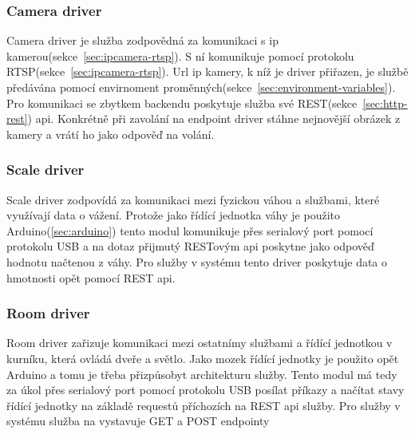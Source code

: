 \subsubsection{Camera driver}
Camera driver je služba zodpovědná za komunikaci s ip kamerou(sekce~\ref{sec:ipcamera-rtsp}).\newline
S ní komunikuje pomocí protokolu RTSP(sekce~\ref{sec:ipcamera-rtsp}).
Url ip kamery, k níž je driver přiřazen, je službě předávána pomocí envirnoment proměnných(sekce~\ref{sec:environment-variables}).
Pro komunikaci se zbytkem backendu poskytuje služba své REST(sekce~\ref{sec:http-rest}) api.
Konkrétně při zavolání na endpoint driver stáhne nejnovější obrázek z kamery a vrátí ho jako odpověď na volání.

\subsubsection{Scale driver}
Scale driver zodpovídá za komunikaci mezi fyzickou váhou a službami, které využívají data o vážení.\newline
Protože jako řídící jednotka váhy je použito Arduino(\ref{sec:arduino}) tento modul komunikuje přes serialový port pomocí protokolu USB a na dotaz přijmutý RESTovým api poskytne jako odpověď hodnotu načtenou z váhy.
Pro služby v systému tento driver poskytuje data o hmotnosti opět pomocí REST api.

\subsubsection{Room driver}
Room driver zařizuje komunikaci mezi ostatnímy službami a řídící jednotkou v kurníku, která ovládá dveře a světlo.\newline
Jako mozek řídící jednotky je použito opět Arduino a tomu je třeba přizpůsobyt architekturu služby.
Tento modul má tedy za úkol přes serialový port pomocí protokolu USB posílat příkazy a načítat stavy řídící jednotky na základě requestů příchozích na REST api služby.
Pro služby v systému služba na vystavuje GET a POST endpointy

